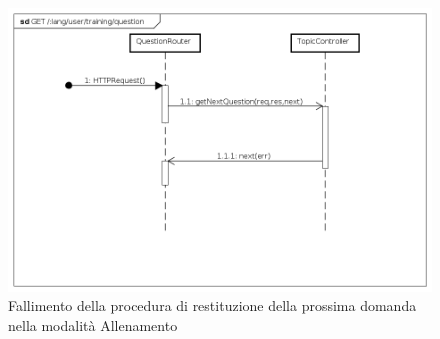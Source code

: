 \begin{itemize}
\begin{figure}[ht]
	\centering
	\includegraphics[scale=0.45]{UML/DiagrammiDiSequenza/Back-end/GET__lang_user_training_question_failure.png}
	\caption{Fallimento della procedura di restituzione della prossima domanda nella modalità Allenamento}
\end{figure}
\FloatBarrier

\end{itemize}






